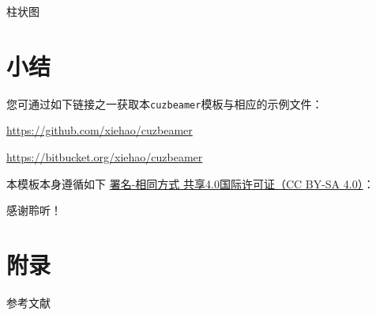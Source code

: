 \documentclass[algorithm,pgfplots]{styles/cuzbeamer}
\begin{document}
    \begin{frame}
        \begin{block}{柱状图}
            \begin{figure}
            \end{figure}
        \end{block}
    \end{frame}

    \section{小结}

    \begin{frame}{}
        \begin{leftbar}
            您可通过如下链接之一获取本\texttt{cuzbeamer}模板与相应的示例文件：
            \par
            \begin{center}
                \href{https://github.com/xiehao/cuzbeamer}{https://github.com/xiehao/cuzbeamer}\par
                \href{https://bitbucket.org/xiehao/cuzbeamer}{https://bitbucket.org/xiehao/cuzbeamer}
            \end{center}
            本模板本身遵循如下
            \href{http://creativecommons.org/licenses/by-sa/4.0/}{署名-相同方式
            共享4.0国际许可证（CC BY-SA 4.0）}：
            \begin{center}
                \ccbysa
            \end{center}
        \end{leftbar}
    \end{frame}

    \begin{standout}[]
        感谢聆听！
    \end{standout}

    \appendix

    \section{附录}

    \begin{frame}[allowframebreaks]{参考文献}
        
        
    \end{frame}
\end{document}
